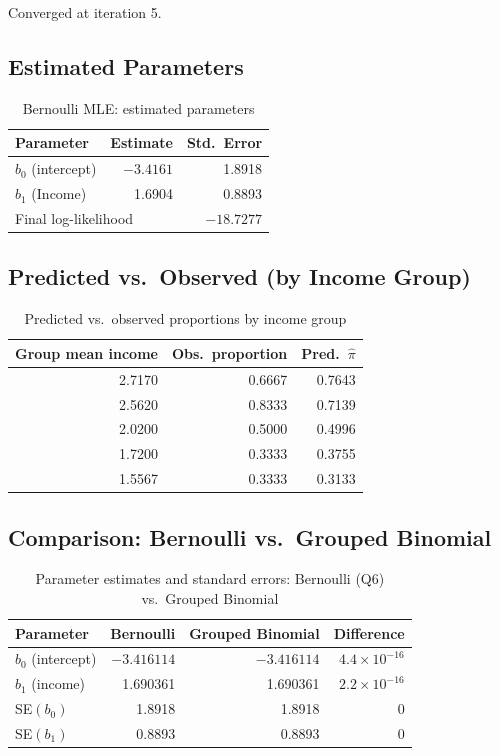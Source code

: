 \documentclass[12pt,a4paper]{article}
\begin{document}
Converged at iteration 5.

\subsection{Estimated Parameters}

\begin{table}[H]
\centering
\caption{Bernoulli MLE: estimated parameters}
\begin{tabular}{lrr}
\toprule
Parameter & Estimate & Std.\ Error \\
\midrule
$b_0$ (intercept) & $-3.4161$ & 1.8918 \\
$b_1$ (Income)    &  1.6904   & 0.8893 \\
\midrule
\multicolumn{2}{l}{Final log-likelihood} & $-18.7277$ \\
\bottomrule
\end{tabular}
\end{table}

\subsection{Predicted vs.\ Observed (by Income Group)}

\begin{table}[H]
\centering
\caption{Predicted vs.\ observed proportions by income group}
\begin{tabular}{rrr}
\toprule
Group mean income & Obs.\ proportion & Pred.\ $\hat{\pi}$ \\
\midrule
2.7170 & 0.6667 & 0.7643 \\
2.5620 & 0.8333 & 0.7139 \\
2.0200 & 0.5000 & 0.4996 \\
1.7200 & 0.3333 & 0.3755 \\
1.5567 & 0.3333 & 0.3133 \\
\bottomrule
\end{tabular}
\end{table}

\subsection{Comparison: Bernoulli vs.\ Grouped Binomial}

\begin{table}[H]
\centering
\caption{Parameter estimates and standard errors: Bernoulli (Q6) vs.\ Grouped Binomial}
\begin{tabular}{lrrr}
\toprule
Parameter & Bernoulli & Grouped Binomial & Difference \\
\midrule
$b_0$ (intercept) & $-3.416114$ & $-3.416114$ & $4.4\times10^{-16}$ \\
$b_1$ (income)    &  1.690361   &  1.690361   & $2.2\times10^{-16}$ \\
\midrule
SE$(b_0)$         &  1.8918     &  1.8918     & 0 \\
SE$(b_1)$         &  0.8893     &  0.8893     & 0 \\
\bottomrule
\end{tabular}
\end{table}
\end{document}
